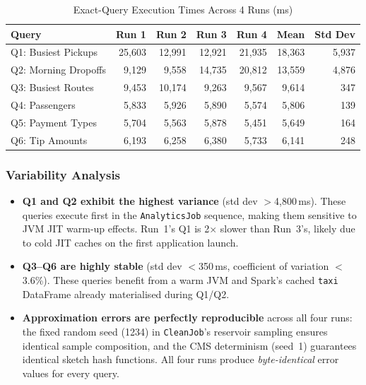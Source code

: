 \documentclass{article}
\begin{document}
\begin{table}[H]
\centering
\caption{Exact-Query Execution Times Across 4 Runs (ms)}
\label{tab:crossrun}
\begin{tabular}{l r r r r | r r}
\toprule
\textbf{Query} & \textbf{Run 1} & \textbf{Run 2} & \textbf{Run 3} & \textbf{Run 4} & \textbf{Mean} & \textbf{Std Dev} \\
\midrule
Q1: Busiest Pickups  & 25{,}603 & 12{,}991 & 12{,}921 & 21{,}935 & 18{,}363 & 5{,}937 \\
Q2: Morning Dropoffs & 9{,}129  & 9{,}558  & 14{,}735 & 20{,}812 & 13{,}559 & 4{,}876 \\
Q3: Busiest Routes   & 9{,}453  & 10{,}174 & 9{,}263  & 9{,}567  & 9{,}614  & 347 \\
Q4: Passengers       & 5{,}833  & 5{,}926  & 5{,}890  & 5{,}574  & 5{,}806  & 139 \\
Q5: Payment Types    & 5{,}704  & 5{,}563  & 5{,}878  & 5{,}451  & 5{,}649  & 164 \\
Q6: Tip Amounts      & 6{,}193  & 6{,}258  & 6{,}380  & 5{,}733  & 6{,}141  & 248 \\
\bottomrule
\end{tabular}
\end{table}

\subsubsection{Variability Analysis}

\begin{itemize}[nosep]
    \item \textbf{Q1 and Q2 exhibit the highest variance} (std dev $>$4{,}800\,ms). These queries execute first in the \texttt{AnalyticsJob} sequence, making them sensitive to JVM JIT warm-up effects. Run~1's Q1 is 2$\times$ slower than Run~3's, likely due to cold JIT caches on the first application launch.
    \item \textbf{Q3--Q6 are highly stable} (std dev $<$350\,ms, coefficient of variation $<$3.6\%). These queries benefit from a warm JVM and Spark's cached \texttt{taxi} DataFrame already materialised during Q1/Q2.
    \item \textbf{Approximation errors are perfectly reproducible} across all four runs: the fixed random seed (1234) in \texttt{CleanJob}'s reservoir sampling ensures identical sample composition, and the CMS determinism (seed~1) guarantees identical sketch hash functions. All four runs produce \emph{byte-identical} error values for every query.
\end{itemize}
\end{document}
